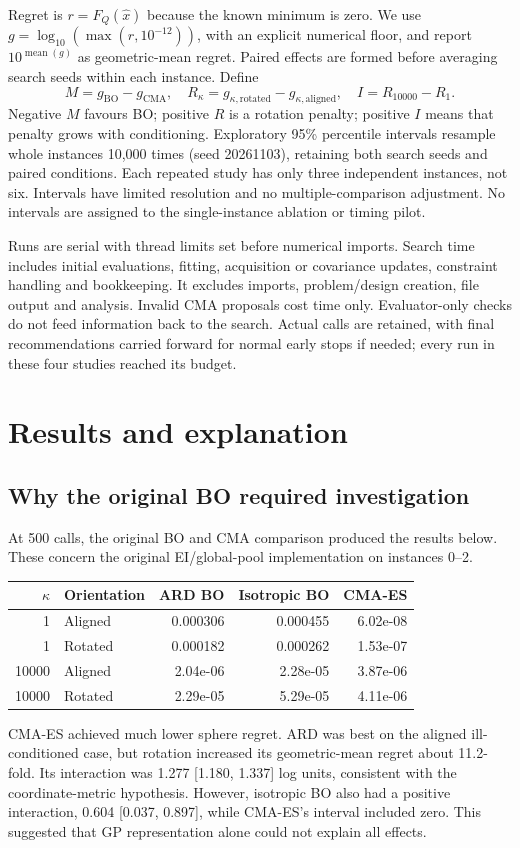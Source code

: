 \documentclass[12pt]{article}
\begin{document}
Regret is $r=F_Q(\hat x)$ because the known minimum is zero. We use
$g=\log_{10}(\max(r,10^{-12}))$, with an explicit numerical floor, and
report $10^{\operatorname{mean}(g)}$ as geometric-mean regret. Paired effects
are formed before averaging search seeds within each instance. Define
\[
 M=g_{\mathrm{BO}}-g_{\mathrm{CMA}},\quad
 R_\kappa=g_{\kappa,\mathrm{rotated}}-g_{\kappa,\mathrm{aligned}},\quad
 I=R_{10000}-R_1.
\]
Negative $M$ favours BO; positive $R$ is a rotation penalty; positive $I$
means that penalty grows with conditioning. Exploratory 95\% percentile
intervals resample whole instances 10,000 times (seed 20261103), retaining
both search seeds and paired conditions. Each repeated study has only three
independent instances, not six. Intervals have limited resolution and no
multiple-comparison adjustment. No intervals are assigned to the single-instance
ablation or timing pilot.

Runs are serial with thread limits set before numerical imports. Search time
includes initial evaluations, fitting, acquisition or covariance updates,
constraint handling and bookkeeping. It excludes imports, problem/design
creation, file output and analysis. Invalid CMA proposals cost time only.
Evaluator-only checks do not feed information back to the search. Actual calls
are retained, with final recommendations carried forward for normal early
stops if needed; every run in these four studies reached its budget.

\section{Results and explanation}
\subsection{Why the original BO required investigation}
At 500 calls, the original BO and CMA comparison produced the results below.
These concern the original EI/global-pool implementation on instances 0--2.
\begin{center}
\begin{tabular}{rlrrr}
\hline
$\kappa$ & Orientation & ARD BO & Isotropic BO & CMA-ES \\
\hline
1 & Aligned & 0.000306 & 0.000455 & 6.02e-08 \\
1 & Rotated & 0.000182 & 0.000262 & 1.53e-07 \\
10000 & Aligned & 2.04e-06 & 2.28e-05 & 3.87e-06 \\
10000 & Rotated & 2.29e-05 & 5.29e-05 & 4.11e-06 \\
\hline
\end{tabular}
\end{center}
CMA-ES achieved much lower sphere regret. ARD was best on the aligned
ill-conditioned case, but rotation increased its geometric-mean regret about
11.2-fold. Its interaction was 1.277 [1.180, 1.337] log units, consistent with
the coordinate-metric hypothesis. However, isotropic BO also had a positive
interaction, 0.604 [0.037, 0.897], while CMA-ES's interval included zero.
This suggested that GP representation alone could not explain all effects.
\end{document}
